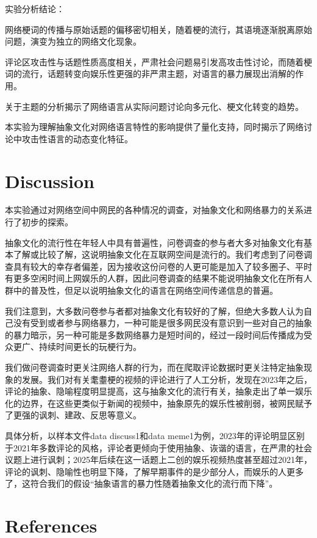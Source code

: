 \documentclass[12pt,a4paper]{ctexart}
\begin{document}
实验分析结论：

网络梗词的传播与原始话题的偏移密切相关，随着梗的流行，其语境逐渐脱离原始问题，演变为独立的网络文化现象。

评论区攻击性与话题性质高度相关，严肃社会问题易引发高攻击性讨论，而随着梗词的流行，话题转变向娱乐性更强的非严肃主题，对语言的暴力展现出消解的作用。

关于主题的分析揭示了网络语言从实际问题讨论向多元化、梗文化转变的趋势。

本实验为理解抽象文化对网络语言特性的影响提供了量化支持，同时揭示了网络讨论中攻击性语言的动态变化特征。



\section{Discussion}
本实验通过对网络空间中网民的各种情况的调查，对抽象文化和网络暴力的关系进行了初步的探索。

抽象文化的流行性在年轻人中具有普遍性，问卷调查的参与者大多对抽象文化有基本了解或比较了解，这说明抽象文化在互联网空间是流行的。我们考虑到了问卷调查具有较大的幸存者偏差，因为接收这份问卷的人更可能是加入了较多圈子、平时有更多空闲时间上网娱乐的人群，因此问卷调查的结果不能说明抽象文化在所有人群中的普及性，但足以说明抽象文化的语言在网络空间传递信息的普遍。

我们注意到，大多数问卷参与者都对抽象文化有较好的了解，但绝大多数人认为自己没有受到或者参与网络暴力，一种可能是很多网民没有意识到一些对自己的抽象的暴力暗示，另一种可能是多数网络暴力是短时间的，经过一段时间后传播成为受众更广、持续时间更长的玩梗行为。

我们做问卷调查时更关注网络人群的行为，而在爬取评论数据时更关注特定抽象现象的发展。我们对有关耄耋梗的视频的评论进行了人工分析，发现在2023年之后，评论的抽象、隐喻程度明显提高，这与抽象文化的流行有关，抽象走出了单一娱乐化的边界，在这些更类似于新闻的视频中，抽象原先的娱乐性被削弱，被网民赋予了更强的讽刺、建政、反思等意义。

具体分析，以样本文件data discuss1和data meme1为例，2023年的评论明显区别于2021年多数评论的风格，评论者更倾向于使用抽象、诙谐的语言，在严肃的社会议题上进行讽刺；2025年后续在这一话题上二创的娱乐视频热度甚至超过2021年，评论的讽刺、隐喻性也明显下降，了解早期事件的是少部分人，而娱乐的人更多了，这符合我们的假设“抽象语言的暴力性随着抽象文化的流行而下降”。


\section{References}
\end{document}
